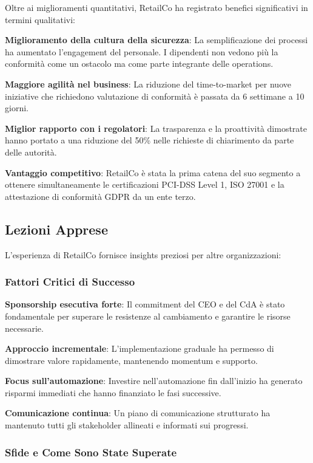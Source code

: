 Oltre ai miglioramenti quantitativi, RetailCo ha registrato benefici significativi in termini qualitativi:

\textbf{Miglioramento della cultura della sicurezza}: La semplificazione dei processi ha aumentato l'engagement del personale. I dipendenti non vedono più la conformità come un ostacolo ma come parte integrante delle operations.

\textbf{Maggiore agilità nel business}: La riduzione del time-to-market per nuove iniziative che richiedono valutazione di conformità è passata da 6 settimane a 10 giorni.

\textbf{Miglior rapporto con i regolatori}: La trasparenza e la proattività dimostrate hanno portato a una riduzione del 50\% nelle richieste di chiarimento da parte delle autorità.

\textbf{Vantaggio competitivo}: RetailCo è stata la prima catena del suo segmento a ottenere simultaneamente le certificazioni PCI-DSS Level 1, ISO 27001 e la attestazione di conformità GDPR da un ente terzo.

\subsection{Lezioni Apprese}
\label{subsec:4.7.4_lezioni}

L'esperienza di RetailCo fornisce insights preziosi per altre organizzazioni:

\subsubsection{Fattori Critici di Successo}

\textbf{Sponsorship esecutiva forte}: Il commitment del CEO e del CdA è stato fondamentale per superare le resistenze al cambiamento e garantire le risorse necessarie.

\textbf{Approccio incrementale}: L'implementazione graduale ha permesso di dimostrare valore rapidamente, mantenendo momentum e supporto.

\textbf{Focus sull'automazione}: Investire nell'automazione fin dall'inizio ha generato risparmi immediati che hanno finanziato le fasi successive.

\textbf{Comunicazione continua}: Un piano di comunicazione strutturato ha mantenuto tutti gli stakeholder allineati e informati sui progressi.

\subsubsection{Sfide e Come Sono State Superate}

